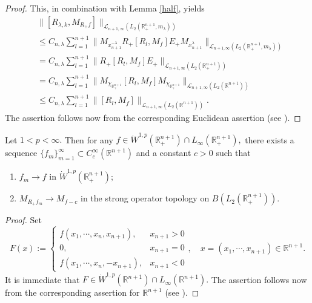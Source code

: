 \documentclass[12pt]{amsart}
\begin{document}
\begin{proof}
This, in combination with Lemma \ref{half}, yields
\begin{align*}
&\|[R_{\lambda,k},M_{R_+f}]\|_{\mathcal{L}_{n+1,\infty}(L_2(\mathbb{R}^{n+1}_+,m_{\lambda}))}\\
&\leq C_{n,\lambda}\sum_{l=1}^{n+1}\Big\|M_{x_{n+1}^{-\lambda}} R_+[R_l,M_f]E_+ M_{x_{n+1}^{\lambda}}\Big\|_{\mathcal{L}_{n+1,\infty}(L_2(\mathbb{R}^{n+1}_+,m_{\lambda}))}\\
&=C_{n,\lambda}\sum_{l=1}^{n+1}\Big\|R_+[R_l,M_f]E_+\Big\|_{\mathcal{L}_{n+1,\infty}(L_2(\mathbb{R}^{n+1}_+))}\\
&=C_{n,\lambda} \sum_{l=1}^{n+1}\Big\|M_{\chi_{\mathbb{R}_+^{n+1}}}[R_l,M_f]M_{\chi_{\mathbb{R}_+^{n+1}}}\Big\|_{\mathcal{L}_{n+1,\infty}(L_2(\mathbb{R}^{n+1}))}\\
&\leq C_{n,\lambda} \sum_{l=1}^{n+1}\Big\|[R_l,M_f]\Big\|_{\mathcal{L}_{n+1,\infty}(L_2(\mathbb{R}^{n+1}))}.
\end{align*}
The assertion follows now from the corresponding Euclidean assertion (see \cite[Theorem 1]{LMSZ}).
\end{proof}

\begin{lemma}\label{density lemma} Let $1<p<\infty.$ Then for any $f \in \dot{W}^{1,p}(\mathbb{R}_+^{n+1})\cap L_{\infty}(\mathbb{R}_+^{n+1}),$ there exists a sequence $\{f_m\}_{m=1}^\infty \subset C^{\infty}_c(\mathbb{R}^{n+1})$ and a constant $c>0$ such that
\begin{enumerate}[{\rm (i)}]
\item $f_m\to f$ in $\dot{W}^{1,p}(\mathbb{R}_+^{n+1});$
\item $M_{R_+f_m}\rightarrow M_{f-c}$ in the strong operator topology on $B(L_2(\mathbb{R}^{n+1}_+))$.
\end{enumerate}	
\end{lemma}
\begin{proof} Set
$$F(x):=
\begin{cases}
f(x_1,\cdots,x_n,x_{n+1}),& x_{n+1}>0\\
0,& x_{n+1}=0\\
f(x_1,\cdots,x_n,-x_{n+1}),& x_{n+1}<0
\end{cases},\quad x=(x_1,\cdots,x_{n+1})\in\mathbb{R}^{n+1}.
$$
It is immediate that $F\in\dot{W}^{1,p}(\mathbb{R}^{n+1})\cap L_{\infty}(\mathbb{R}^{n+1}).$ The assertion follows now from the corresponding assertion for $\mathbb{R}^{n+1}$ (see \cite[Theorem 3]{LMSZ}).
\end{proof}
\end{document}

